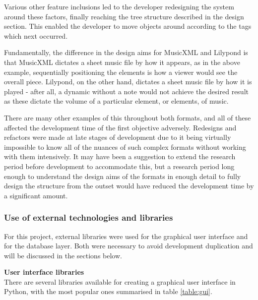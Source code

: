 Various other feature inclusions led to the developer redesigning the system around these factors, finally reaching the tree structure described in the design section. This enabled the developer to move objects around according to the tags which next occurred.

Fundamentally, the difference in the design aims for MusicXML and Lilypond is that MusicXML dictates a sheet music file by how it appears, as in the above example, sequentially positioning the elements is how a viewer would see the overall piece. Lilypond, on the other hand, dictates a sheet music file by how it is played - after all, a dynamic without a note would not achieve the desired result as these dictate the volume of a particular element, or elements, of music. 

There are many other examples of this throughout both formats, and all of these affected the development time of the first objective adversely. Redesigns and refactors were made at late stages of development due to it being virtually impossible to know all of the nuances of such complex formats without working with them intensively. It may have been a suggestion to extend the research period before development to accommodate this, but a research period long enough to understand the design aims of the formats in enough detail to fully design the structure from the outset would have reduced the development time by a significant amount.

\subsubsection{Use of external technologies and libraries}
For this project, external libraries were used for the graphical user interface and for the database layer. Both were necessary to avoid development duplication and will be discussed in the sections below.

\textbf{User interface libraries} \\
There are several libraries available for creating a graphical user interface in Python, with the most popular ones summarised in table \ref{table:gui}.

